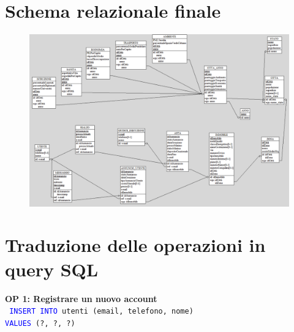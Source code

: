 \documentclass[a4paper,12pt]{report}
\begin{document}
            \section{Schema relazionale finale}
            \begin{figure}[H]
                    \centering{}
                    \includegraphics[angle=90,width=\textwidth,height=0.9\textheight,keepaspectratio]{./images/relational_scheme.png}
            \end{figure}
                
            \section{Traduzione delle operazioni in query SQL}

            \textbf{OP 1: Registrare un nuovo account} \\
            \texttt{
                \textcolor{blue}{INSERT INTO} utenti (email, telefono, nome) \\
                \textcolor{blue}{VALUES} (?, ?, ?) \\
            } 
            
\end{document}

